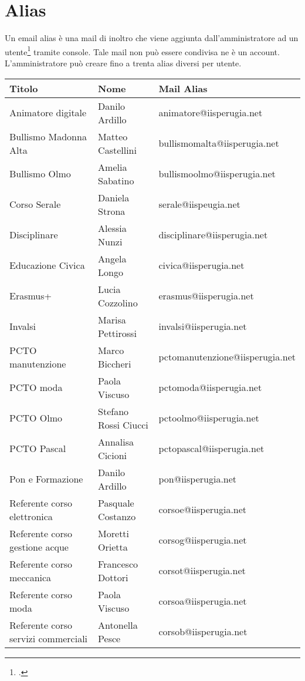\section{Alias}
Un email alias è una mail di inoltro che viene aggiunta dall'amministratore ad un utente\footcite{Google2023d} tramite console. Tale mail non può essere condivisa ne è un account.
L'amministratore può creare fino a trenta alias diversi per utente.
\begin{center}
	
\begin{tabular}{lll}
	\toprule 
	Titolo&Nome&Mail Alias\\
	\midrule
	Animatore digitale&
	Danilo Ardillo&
	animatore@iisperugia.net\\
	Bullismo Madonna Alta&
	Matteo Castellini&
	bullismomalta@iisperugia.net\\
	Bullismo Olmo&
	Amelia Sabatino&
	bullismoolmo@iisperugia.net\\
	Corso Serale&
	Daniela Strona&
	serale@iispeugia.net\\
	Disciplinare&
	Alessia Nunzi&
	disciplinare@iisperugia.net\\
	Educazione Civica&
	Angela Longo&
	civica@iisperugia.net\\
	Erasmus+&
	Lucia Cozzolino&
	erasmus@iisperugia.net\\
	Invalsi&
	Marisa Pettirossi&
	invalsi@iisperugia.net\\
	PCTO manutenzione&
	Marco Biccheri&
	pctomanutenzione@iisperugia.net\\
	PCTO moda&
	Paola Viscuso&
	pctomoda@iisperugia.net\\
	PCTO Olmo&
	Stefano Rossi Ciucci&
	pctoolmo@iisperugia.net\\
	PCTO Pascal&
	Annalisa Cicioni&
	pctopascal@iisperugia.net\\
	Pon e Formazione&
	Danilo Ardillo&
	pon@iisperugia.net\\
	Referente corso elettronica&
	Pasquale Costanzo&
	corsoe@iisperugia.net\\
	Referente corso gestione acque&
	Moretti Orietta&
	corsog@iisperugia.net\\
	Referente corso meccanica&
	Francesco Dottori&
	corsot@iisperugia.net\\
	Referente corso moda&
	Paola Viscuso&
	corsoa@iisperugia.net\\
	Referente corso servizi commerciali&
	Antonella Pesce&
	corsob@iisperugia.net\\

\end{tabular}
\end{center}

